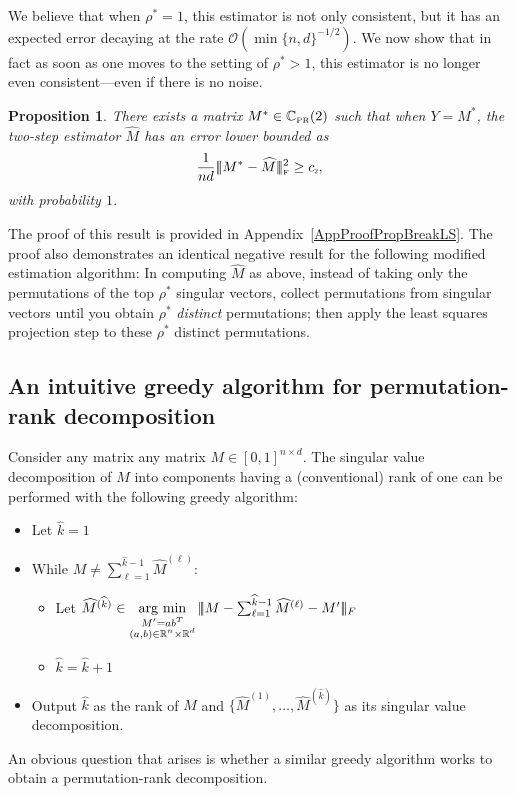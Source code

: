 \documentclass[11pt, hidelinks]{article} %
\newtheorem{proposition}{Proposition}
\newcommand{\Order}{\mathcal{O}}
\newcommand{\matsnorm}[2]{|\!|\!| #1 | \! | \!|_{{#2}}}
\newcommand{\frobnorm}[1]{\ensuremath{\matsnorm{#1}{\mbox{\tiny{F}}}}}
\newcommand{\argmin}{\operatornamewithlimits{arg~min}}
\newcommand{\reals}{\ensuremath{\mathbb{R}}}
\newcommand{\numrows}{n}
\newcommand{\numcols}{d}
\newcommand{\plaincon}{c}
\newcommand{\ULOW}{\ensuremath{\plaincon_{\mbox{\scalebox{.5}{2}}}}}
\newcommand{\wtmatrix}{M}
\newcommand{\wt}{\wtmatrix}
\newcommand{\wtstar}{\wtmatrix^*}
\newcommand{\matrixset}{\mathbb{C}}
\newcommand{\wthat}{\widehat{\wtmatrix}}
\newcommand{\permset}{\matrixset_{\mbox{\tiny PR}}}
\newcommand{\obs}{\ensuremath{Y}}
\newcommand{\permrank}{\rho}
\newcommand{\temprank}{k}
\newcommand{\leftvec}{a}
\newcommand{\rightvec}{b}
\newcommand{\permstar}{\permrank^*}
\begin{document}
We
believe that when $\permstar=1$, this estimator is not only
consistent, but it has an expected error decaying at the rate
$\Order(\min\{\numrows,\numcols\}^{-1/2})$. We now show that in fact as soon as one moves
to the setting of $\permstar > 1$, this estimator is no longer even
consistent---even if there is no noise.
\begin{proposition}
\label{PropBreakLS}
There exists a matrix $\wtstar \in
\permset(2)$ such that when $\obs = \wtstar$, the two-step estimator
$\wthat$ has an error lower
bounded as
\begin{align*}
\frac{1}{\numrows \numcols} \frobnorm{\wtstar - \wthat}^2 \geq \ULOW,
\end{align*}
with probability $1$.
\end{proposition}

The proof of this result is provided in Appendix~\ref{AppProofPropBreakLS}. The proof also demonstrates an identical negative result
for the following modified estimation algorithm: In computing $\wthat$ as above, instead of taking
only the permutations of the top $\permstar$ singular vectors, collect
permutations from singular vectors until you obtain $\permstar$
\emph{distinct} permutations; then apply the least squares projection step to
these $\permstar$ distinct permutations.


\subsection{An intuitive greedy algorithm for permutation-rank decomposition}

Consider any matrix any matrix $\wt \in [0,1]^{\numrows \times
  \numcols}$. The singular value decomposition of $\wt$ into components having a (conventional) rank of one can be performed with the following greedy
algorithm:
\begin{itemize}
	\itemsep0em
\item Let $\widehat{\temprank} = 1$
%
\item While $\wt \neq \sum_{\ell=1}^{\widehat{\temprank} - 1}
          \wthat^{(\ell)}$:
\begin{itemize}
\item Let $\wthat^{(\widehat{\temprank})} \in \argmin
  \limits_{\substack{\wt' = \leftvec \rightvec^T\\(\leftvec,\rightvec) \in
      \reals^\numrows \times \reals^\numcols}}
  \matsnorm{ \wt - \sum_{\ell=1}^{\widehat{\temprank}
      - 1} \wthat^{(\ell)} - \wt'}{F}$
\item $\widehat{\temprank} = \widehat{\temprank} + 1$
\end{itemize}
\item Output $\widehat{\temprank}$ as the rank of $\wt$ and
  $\{\wthat^{(1)}, \ldots, \wthat^{(\widehat{\temprank})} \}$ as its
  singular value decomposition.
\end{itemize}
An obvious question that arises is whether a similar greedy algorithm
works to obtain a permutation-rank decomposition.
\end{document}
